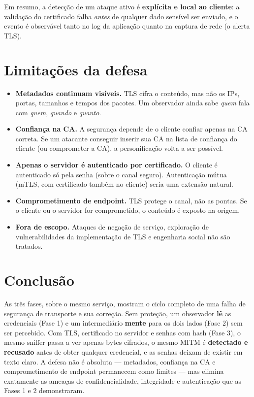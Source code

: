 \documentclass[11pt,a4paper]{article}
\begin{document}
Em resumo, a detecção de um ataque ativo é \textbf{explícita e local ao cliente}:
a validação do certificado falha \emph{antes} de qualquer dado sensível ser
enviado, e o evento é observável tanto no log da aplicação quanto na captura de
rede (o alerta TLS).

\section{Limitações da defesa}

\begin{itemize}[leftmargin=1.4em]
  \item \textbf{Metadados continuam visíveis.} TLS cifra o conteúdo, mas não os
  IPs, portas, tamanhos e tempos dos pacotes. Um observador ainda sabe
  \emph{quem} fala com \emph{quem}, \emph{quando} e \emph{quanto}.
  \item \textbf{Confiança na CA.} A segurança depende de o cliente confiar apenas
  na CA correta. Se um atacante conseguir inserir sua CA na lista de confiança do
  cliente (ou comprometer a CA), a personificação volta a ser possível.
  \item \textbf{Apenas o servidor é autenticado por certificado.} O cliente é
  autenticado só pela senha (sobre o canal seguro). Autenticação mútua (mTLS,
  com certificado também no cliente) seria uma extensão natural.
  \item \textbf{Comprometimento de endpoint.} TLS protege o canal, não as pontas.
  Se o cliente ou o servidor for comprometido, o conteúdo é exposto na origem.
  \item \textbf{Fora de escopo.} Ataques de negação de serviço, exploração de
  vulnerabilidades da implementação de TLS e engenharia social não são tratados.
\end{itemize}

\section{Conclusão}

As três fases, sobre o mesmo serviço, mostram o ciclo completo de uma falha de
segurança de transporte e sua correção. Sem proteção, um observador \textbf{lê}
as credenciais (Fase 1) e um intermediário \textbf{mente} para os dois lados
(Fase 2) sem ser percebido. Com TLS, certificado no servidor e senhas com hash
(Fase 3), o mesmo sniffer passa a ver apenas bytes cifrados, o mesmo MITM é
\textbf{detectado e recusado} antes de obter qualquer credencial, e as senhas
deixam de existir em texto claro. A defesa não é absoluta — metadados, confiança
na CA e comprometimento de endpoint permanecem como limites — mas elimina
exatamente as ameaças de confidencialidade, integridade e autenticação que as
Fases 1 e 2 demonstraram.
\end{document}
